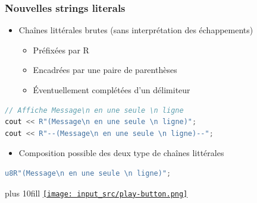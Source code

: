\documentclass[C++.tex]{subfiles}
\begin{document}
\begin{frame}[fragile]
	\frametitle{Nouvelles strings literals}
	\begin{itemize}
		\item Chaînes littérales brutes (sans interprétation des échappements)


		\begin{itemize}
			\item Préfixées par R
			\item Encadrées par une paire de parenthèses
			\item Éventuellement complétées d'un délimiteur
		\end{itemize}
	\end{itemize}

	\begin{lstlisting}[language=C++]
// Affiche Message\n en une seule \n ligne
cout << R"(Message\n en une seule \n ligne)";
cout << R"--(Message\n en une seule \n ligne)--";\end{lstlisting}

	\begin{itemize}
		\item Composition possible des deux type de chaînes littérales
	\end{itemize}

	\begin{lstlisting}[language=C++]
u8R"(Message\n en une seule \n ligne)";\end{lstlisting}

	\vskip 10mm plus 10fill
	\hfill
	\href{https://godbolt.org/#g:!((g:!((g:!((h:codeEditor,i:(filename:'1',fontScale:14,fontUsePx:'0',j:1,lang:c%2B%2B,selection:(endColumn:1,endLineNumber:9,positionColumn:1,positionLineNumber:9,selectionStartColumn:1,selectionStartLineNumber:9,startColumn:1,startLineNumber:9),source:'%23include+%3Ciostream%3E%0A%0Aint+main()%0A%7B%0A++std::cout+%3C%3C+R%22(Message%5Cn+en+une+seule+%5Cn+ligne)%22+%3C%3C+!'%5Cn!'%3B%0A++std::cout+%3C%3C+R%22--(Message%5Cn+en+une+seule+%5Cn+ligne)--%22+%3C%3C+!'%5Cn!'%3B%0A++std::cout+%3C%3C+u8R%22(Message%5Cn+en+une+seule+%5Cn+ligne)%22+%3C%3C+!'%5Cn!'%3B%0A%7D%0A'),l:'5',n:'0',o:'C%2B%2B+source+%231',t:'0')),k:50,l:'4',n:'0',o:'',s:0,t:'0'),(g:!((h:executor,i:(argsPanelShown:'1',compilationPanelShown:'0',compiler:g112,compilerOutShown:'0',execArgs:'',execStdin:'',fontScale:14,fontUsePx:'0',j:1,lang:c%2B%2B,libs:!((name:boost,ver:'175')),options:'-std%3Dc%2B%2B11',source:1,stdinPanelShown:'1',tree:'1',wrap:'0'),l:'5',n:'0',o:'Executor+x86-64+gcc+11.2+(C%2B%2B,+Editor+%231)',t:'0')),header:(),k:50,l:'4',n:'0',o:'',s:0,t:'0')),l:'2',n:'0',o:'',t:'0')),version:4}{\texttt{[image: input\_src/play-button.png]}}
\end{frame}
\end{document}
